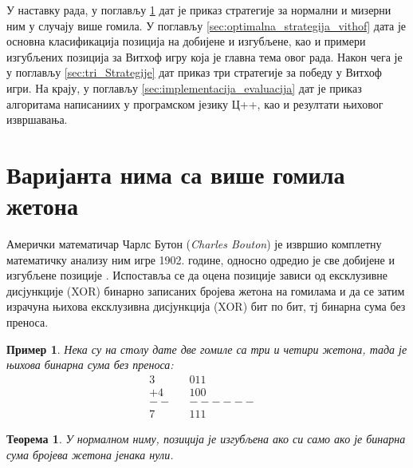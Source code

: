 \documentclass[a4paper]{article}
\newtheorem{example}{Пример}
\newtheorem{theorem}{Теорема}
\begin{document}
У наставку рада, у поглављу \ref{sec:optimalna_strategija} дат је приказ стратегије за нормални и мизерни ним у случају више гомила. У поглављу \ref{sec:optimalna_strategija_vithof} дата је основна класификација позиција на добијене и изгубљене, као и примери изгубљених позиција за Витхоф игру која је главна тема овог рада. Након чега је у поглављу \ref{sec:tri_Strategije} дат приказ три стратегије за победу у Витхоф игри. На крају, у поглављу \ref{sec:implementacija_evaluacija} дат је приказ алгоритама написаниих у програмском језику Ц++, као и резултати њиховог извршавања.

\section{Варијанта нима са више гомила жетона}
\label{sec:optimalna_strategija}

Амерички математичар Чарлс Бутон (\textit{Charles Bouton}) је извршио комплетну математичку анализу ним игре 1902. године, односно одредио је све добијене и изгубљене позиције \cite{carls_buton}. Испоставља се да оцена позиције зависи од ексклузивне дисјункције (XOR) бинарно записаних бројева жетона на гомилама и да се затим израчуна њихова ексклузивна дисјункција (XOR) бит по бит, тј бинарна сума без преноса. 

\begin{example} 
	Нека су на столу дате две гомиле са три и четири жетона, тада је њихова бинарна сума без преноса:	
	\begin{align*}
		3&		& 0 1 1&\\
		+4&		& 1 0 0&\\
		--&		&------&\\
		7&		& 1 1 1&
	\end{align*}
\end{example}

\begin{theorem}
	\label{thm:pobeda}
	У нормалном ниму, позиција је изгубљена ако си само ако је бинарна сума бројева жетона јенака нули.
\end{theorem}
\end{document}

